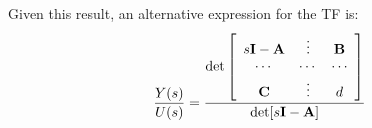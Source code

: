 Given this result, an alternative expression for the TF is:
\[
\frac{{Y(s)}}{{U(s)}} = \frac{{\det \left[ {\begin{array}{*{20}c}
   {s{\bf{I}} - {\bf{A}}} &  \vdots  & {\bf{B}}  \\
    \cdots  &  \cdots  &  \cdots   \\
   {\bf{C}} &  \vdots  & d  \\
\end{array}} \right]}}{{\det [s{\bf{I}} - {\bf{A}}]}}
\]


\endinput

